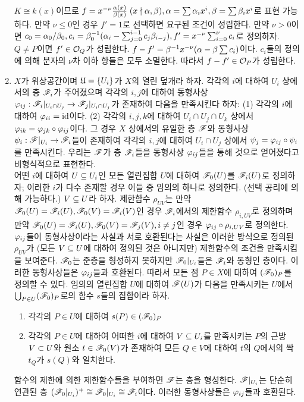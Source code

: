 \begin{enumerate}[label=\tb{1.\arabic*.},itemindent=0mm,itemsep=4mm]
	$K\cong k(x)$이므로 $f=x^{-\nu}\frac{\alpha(x)}{\beta(x)}\;(x\nmid\alpha,\beta),\alpha=\sum\alpha_ix^i,\beta=\sum\beta_ix^i$로 표현 가능하다.
	만약 $\nu\le 0$인 경우 $f'=1$로 선택하면 요구된 조건이 성립한다.
	만약 $\nu>0$이면 $c_0=\alpha_0/\beta_0,c_i=\beta_0^{-1}(\alpha_i-\sum_{j=0}^{i-1}c_j\beta_{i-j}),f'=x^{-\nu}\sum_{i=0}^\nu c_i$로 정의하자.
	$Q\ne P$이면 $f'\in\mathcal{O}_Q$가 성립한다. $f-f'=\beta^{-1}x^{-\nu}(\alpha-\beta\sum c_i)$이다.
	$c_i$들의 정의에 의해 분자의 $\nu$차 이하 항들은 모두 소멸한다. 따라서 $f-f'\in\mathcal{O}_P$가 성립한다.
	\item {} $X$가 위상공간이며 $\mathfrak{U}=\{U_i\}$가 $X$의 열린 덮개라 하자.
	각각의 $i$에 대하여 $U_i$ 상에서의 층 $\mathscr{F}_i$가 주어졌으며 각각의 $i,j$에 대하여
	동형사상 $\varphi_{ij}:\mathscr{F}_i|_{U_i\cap U_j}\rightarrow\mathscr{F}_j|_{U_i\cap U_j}$가 존재하여 다음을 만족시킨다 하자:
	(1) 각각의 $i$에 대하여 $\varphi_{ii}=\mathrm{id}$이다.
	(2) 각각의 $i,j,k$에 대하여 $U_i\cap U_j\cap U_k$ 상에서 $\varphi_{ik}=\varphi_{jk}\circ\varphi_{ij}$이다.
	그 경우 $X$ 상에서의 유일한 층 $\mathscr{F}$와 동형사상 $\psi_i:\mathscr{F}|_{U_i}\rightarrow\mathscr{F}_i$들이 존재하여
	각각의 $i,j$에 대하여 $U_i\cap U_j$ 상에서 $\psi_j=\varphi_{ij}\circ\psi_i$를 만족시킨다.
	우리는 $\mathscr{F}$가 층 $\mathscr{F}_i$들을 동형사상 $\varphi_{ij}$들을 통해  것으로 얻어졌다고 비형식적으로 표현한다.\\
	\sol 어떤 $i$에 대하여 $U\subseteq U_i$인 모든 열린집합 $U$에 대하여 $\mathscr{F}_0(U)$를 $\mathscr{F}_i(U)$로 정의하자;
	이러한 $i$가 다수 존재할 경우 이들 중 임의의 하나로 정의한다. (선택 공리에 의해 가능하다.)
	$V\subseteq U$라 하자. 제한함수 $\rho_{UV}$는 만약 $\mathscr{F}_0(U)=\mathscr{F}_i(U),\mathscr{F}_0(V)=\mathscr{F}_i(V)$인 경우
	$\mathscr{F}_i$에서의 제한함수 $\rho_{i,UV}$로 정의하며
	만약 $\mathscr{F}_0(U)=\mathscr{F}_i(U),\mathscr{F}_0(V)=\mathscr{F}_j(V),i\ne j$인 경우 $\varphi_{ij}\circ\rho_{i,UV}$로 정의한다.
	$\varphi_{ij}$들이 동형사상이라는 사실과 서로 호환된다는 사실은 이러한 방식으로 정의된 $\rho_{UV}$가
	(모든 $V\subseteq U$에 대하여 정의된 것은 아니지만) 제한함수의 조건을 만족시킴을 보여준다.
	$\mathscr{F}_0$는 준층을 형성하지 못하지만 $\mathscr{F}_0|_{U_i}$들은 $\mathscr{F}_i$와 동형인 층이다.
	이러한 동형사상들은 $\varphi_{ij}$들과 호환된다.
	따라서 모든 점 $P\in X$에 대하여 $(\mathscr{F}_0)_P$를 정의할 수 있다.
	임의의 열린집합 $U$에 대하여 $\mathscr{F}(U)$가 다음을 만족시키는
	$U$에서 $\bigcup_{P\in U}(\mathscr{F}_0)_P$로의 함수 $s$들의 집합이라 하자.\\[-2mm]
	\begin{enumerate}[label=(\arabic*)]
	\item 각각의 $P\in U$에 대하여 $s(P)\in(\mathscr{F}_0)_P$
	\item 각각의 $P\in U$에 대하여 어떠한 $i$에 대하여 $V\subseteq U_i$를 만족시키는 $P$의 근방 $V\subset U$와
	원소 $t\in\mathscr{F}_0(V)$가 존재하여 모든 $Q\in V$에 대하여 $t$의 $Q$에서의 싹 $t_Q$가 $s(Q)$와 일치한다.\\[-2mm]
	\end{enumerate}
	함수의 제한에 의한 제한함수들을 부여하면 $\mathscr{F}$는 층을 형성한다.
	$\mathscr{F}|_{U_i}$는 단순히 연관된 층 $(\mathscr{F}_0|_{U_i})^+\cong\mathscr{F}_0|_{U_i}\cong\mathscr{F}_i$이다.
	이러한 동형사상들은 $\varphi_{ij}$들과 호환된다.
	\end{enumerate}
	
